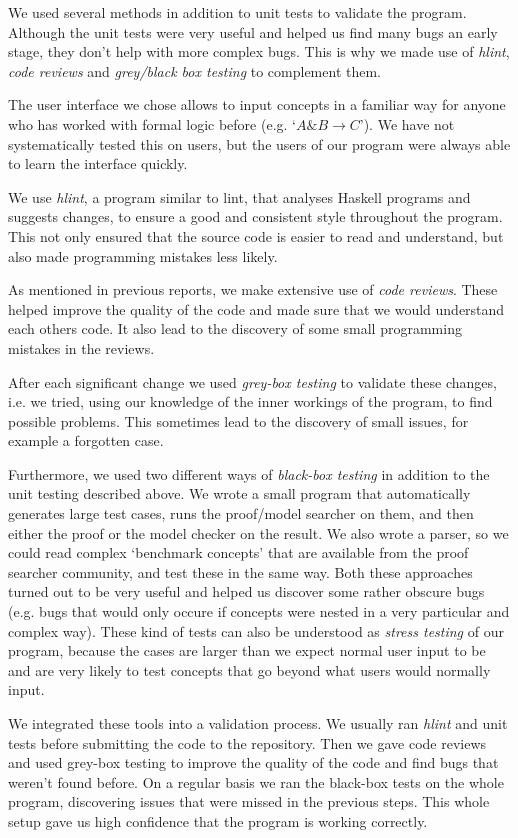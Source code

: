 We used several methods in addition to unit tests to validate the program. Although
the unit tests were very useful and helped us find many bugs an early stage, they don't
help with more complex bugs. This is why we made use of \emph{hlint}, \emph{code reviews} and \emph{grey/black box testing} to complement them.

The user interface we chose allows to input concepts in a familiar way for anyone
who has worked with formal logic before (e.g. `$A \& B \rightarrow C$'). We have not systematically
tested this on users, but the users of our program were always able to learn the interface quickly.

We use \emph{hlint}, a program similar to lint, that analyses Haskell programs and
suggests changes, to ensure a good and consistent style throughout the program. This
not only ensured that the source code is easier to read and understand, but also
made programming mistakes less likely.

As mentioned in previous reports, we make extensive use of \emph{code reviews}. These
helped improve the quality of the code and made sure that we would understand
each others code. It also lead to the discovery of some small programming mistakes
in the reviews.

After each significant change we used \emph{grey-box testing} to validate these
changes, i.e. we tried, using our knowledge of the inner workings of the program,
to find possible problems. This sometimes lead to the discovery of small issues,
for example a forgotten case.

Furthermore, we used two different ways of \emph{black-box testing} in addition to
the unit testing described above. We wrote a small program that automatically generates
large test cases, runs the proof/model searcher on them, and then either the proof
or the model checker on the result. We also wrote a parser, so we could read complex
`benchmark concepts' that are available from the proof searcher community, and
test these in the same way. Both these approaches turned out to be very
useful and helped us discover some rather obscure bugs (e.g. bugs that would only
occure if concepts were nested in a very particular and complex way).
These kind of tests can also be understood as \emph{stress testing} of our
program, because the cases are larger than we expect normal user input to be
and are very likely to test concepts that go beyond what users would normally
input.

We integrated these tools into a validation process.
We usually ran \emph{hlint} and unit tests before submitting the code to the
repository. Then we gave code reviews and used grey-box testing to improve
the quality of the code and find bugs that weren't found before. On a regular
basis we ran the black-box tests on the whole program, discovering issues
that were missed in the previous steps. This whole setup gave us high
confidence that the program is working correctly.
